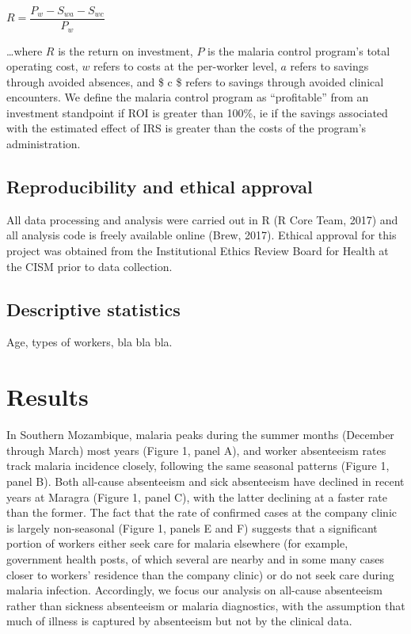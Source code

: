\documentclass[]{article}
\begin{document}
\begin{center}
$R = \dfrac{P_{w} - S_{wa} - S_{wc}}{P_{w}}$

\end{center}

\ldots{}where \(R\) is the return on investment, \(P\) is the malaria
control program's total operating cost, \(w\) refers to costs at the
per-worker level, \(a\) refers to savings through avoided absences, and
\$ c \$ refers to savings through avoided clinical encounters. We define
the malaria control program as ``profitable'' from an investment
standpoint if ROI is greater than 100\%, ie if the savings associated
with the estimated effect of IRS is greater than the costs of the
program's administration.

\subsection{Reproducibility and ethical
approval}\label{reproducibility-and-ethical-approval}

All data processing and analysis were carried out in R (R Core Team,
2017) and all analysis code is freely available online (Brew, 2017).
Ethical approval for this project was obtained from the Institutional
Ethics Review Board for Health at the CISM prior to data collection.

\subsection{Descriptive statistics}\label{descriptive-statistics}

Age, types of workers, bla bla bla.

\section{Results}\label{results}

In Southern Mozambique, malaria peaks during the summer months (December
through March) most years (Figure 1, panel A), and worker absenteeism
rates track malaria incidence closely, following the same seasonal
patterns (Figure 1, panel B). Both all-cause absenteeism and sick
absenteeism have declined in recent years at Maragra (Figure 1, panel
C), with the latter declining at a faster rate than the former. The fact
that the rate of confirmed cases at the company clinic is largely
non-seasonal (Figure 1, panels E and F) suggests that a significant
portion of workers either seek care for malaria elsewhere (for example,
government health posts, of which several are nearby and in some many
cases closer to workers' residence than the company clinic) or do not
seek care during malaria infection. Accordingly, we focus our analysis
on all-cause absenteeism rather than sickness absenteeism or malaria
diagnostics, with the assumption that much of illness is captured by
absenteeism but not by the clinical data.
\end{document}
